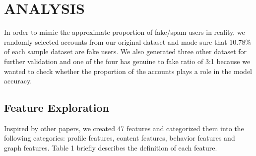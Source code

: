 \documentclass[a4paper, 12pt]{report}
\begin{document}
\section*{ANALYSIS}
In order to mimic the approximate proportion of fake/spam users in reality, we randomly selected accounts from our original dataset and made sure that 10.78\% of each sample dataset are fake users. We also generated three other dataset for further validation and one of the four has genuine to fake ratio of 3:1 because we wanted to check whether the proportion of the accounts plays a role in the model accuracy. 

\subsection*{Feature Exploration}
Inspired by other papers, we created 47 features and categorized them into the following categories: profile features, content features, behavior features and graph features. Table 1 briefly describes the definition of each feature. \par
\end{document}
